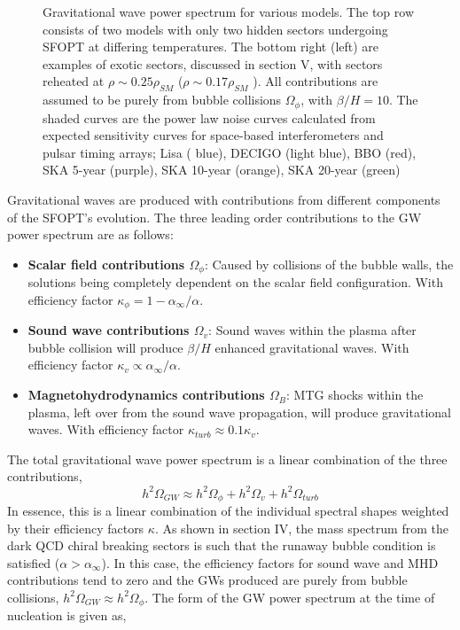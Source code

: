 \documentclass[nofootinbib,twocolumn,preprintnumbers]{revtex4-1}
\begin{document}
\begin{figure}[tb]
\begin{minipage}[c]{\textwidth}
\end{minipage}
\hfill
\caption{ Gravitational wave power spectrum for various models. The top row consists of two models with only two hidden sectors undergoing SFOPT at differing temperatures. The bottom right (left) are examples of exotic sectors, discussed in section V, with sectors reheated at $\rho \sim 0.25\rho_{SM}$ ($\rho \sim 0.17\rho_{SM}$ ). All contributions are assumed to be purely from bubble collisions $\Omega_{\phi}$, with $\beta/H  = 10$.  The shaded curves are the power law noise curves calculated from expected sensitivity curves for space-based interferometers and pulsar timing arrays; Lisa ( blue), DECIGO (light blue), BBO (red), SKA 5-year (purple), SKA 10-year (orange), SKA 20-year (green)   }
\label{fig:Haa}
\end{figure}
Gravitational waves are produced with contributions from different components of the SFOPT's evolution.  The three leading order contributions to the GW power spectrum are as follows:
\begin{itemize}
\item \textbf{Scalar field contributions $\Omega_{\phi}$}: Caused by collisions of the bubble walls, the solutions being completely dependent on the scalar field configuration. With efficiency factor $\kappa_{\phi} = 1 - \alpha_{\infty}/\alpha$.
\item \textbf{Sound wave contributions $\Omega_{v}$}: Sound waves within the plasma after bubble collision will produce $\beta/H$  enhanced gravitational waves. With efficiency factor $\kappa_{v} \propto \alpha_{\infty}/\alpha$.
\item \textbf{Magnetohydrodynamics contributions $\Omega_{B}$}: MTG shocks within the plasma, left over from the sound wave propagation, will produce gravitational waves. With efficiency factor $\kappa_{
turb} \approx 0.1 \kappa_{v} $.
\end{itemize}
The total gravitational wave power spectrum  is a linear combination of the three contributions,
\begin{equation}
h^2\Omega_{GW} \approx h^2\Omega_{\phi} + h^2\Omega_{v} + h^2\Omega_{turb} 
\end{equation}
In essence, this is a linear combination of the individual spectral shapes weighted by their efficiency factors $\kappa$. As shown in section IV, the mass spectrum from the dark QCD chiral breaking sectors is such that the runaway bubble condition is satisfied ($\alpha >\alpha_{\infty}$). In this case, the efficiency factors for sound wave and MHD contributions tend to zero and the GWs produced are purely from bubble collisions, $h^2\Omega_{GW} \approx h^2\Omega_{\phi}$.  The form of the GW power spectrum at the time of nucleation is given as,
\end{document}
